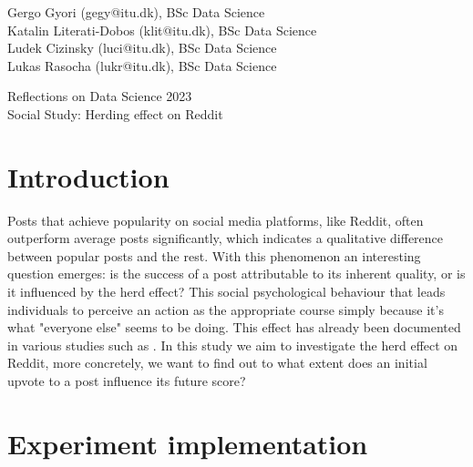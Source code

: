 \documentclass[fleqn,12pt]{article}
\begin{document}
\setlength{\baselineskip}{1.44\baselineskip}



\begin{flushleft}
  {\large Gergo Gyori (gegy@itu.dk), BSc Data Science \\
  Katalin Literati-Dobos (klit@itu.dk), BSc Data Science \\
  Ludek Cizinsky (luci@itu.dk), BSc Data Science \\
  Lukas Rasocha (lukr@itu.dk), BSc Data Science \\}
 \end{flushleft}
 
\begin{center}
  {\Large Reflections on Data Science 2023}\\[5ex]
  {\Large Social Study: Herding effect on Reddit}\\[5ex]

 \end{center}
 




\parindent=20pt 
\parskip=0mm

\section{Introduction}
Posts that achieve popularity on social media platforms, 
like Reddit, often outperform average posts significantly, 
which indicates a qualitative difference between popular posts 
and the rest. With this phenomenon an interesting question emerges:
is the success of a post attributable to its inherent quality,
or is it influenced by the herd effect? This social psychological 
behaviour that leads individuals to perceive an action as the 
appropriate course simply because it's what "everyone else" 
seems to be doing. This effect has already been documented in various studies such as \cite{muchnik} \cite{salganik}.
In this study we aim to investigate the herd effect on Reddit, more
concretely, we want to find out to what extent does an initial upvote to a post
influence its future score?


\section{Experiment implementation}
\end{document}
